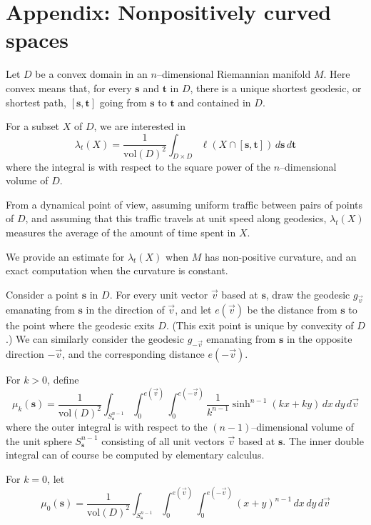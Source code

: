 \documentclass{article}
\newcommand{\s}{{\mathbf s}}
\renewcommand{\t}{{\mathbf t}}
\begin{document}
\noindent 

\noindent 
\section{Appendix: Nonpositively curved spaces}
\label{s:app}

Let $D$ be a convex domain in 
an $n$--dimensional Riemannian manifold $M$. Here convex means that, for every $\s$ and $\t$ in $D$, 
there is a unique shortest geodesic, or shortest path, $[\s,\t]$ going from $\s$ to $\t$ and contained in $D$. 

For a subset $X$ of $D$, we are interested in
$$
\lambda_t(X) =
\frac1{\mathrm{vol}(D)^2} 
\int_{D\times D} \ell(X\cap [\s,\t]) \, d\s \, d\t
$$
where the integral is with respect to the square power of the $n$--dimensional volume of $D$. 

From a dynamical point of view, assuming uniform traffic between pairs of points of $D$, 
and assuming that this traffic travels at unit speed along geodesics, 
$\lambda_t(X)$ measures the average of the amount of time spent in $X$. 

We provide an estimate for $\lambda_t(X)$ when $M$ has non-positive curvature, 
and an exact computation when the curvature is constant. 

Consider a point $\s$ in $D$.
For every unit vector $\vec{v}$ based at $\s$,  
draw the geodesic $g_{\vec{v}}$ emanating from $\s$ in the direction of $\vec{v}$, 
and let $e(\vec{v})$ be the distance from $\s$ to the point  where the geodesic exits $D$. 
(This exit point is unique by convexity of $D$.) 
We can similarly consider the geodesic $g_{-\vec{v}}$ emanating from $\s$ in the opposite direction $-\vec{v}$, 
and the corresponding distance $e(-\vec{v})$.

For $k>0$, define 
\begin{equation}
\label{e:mu_k}
\mu_k(\s) = \frac 1 {\mathrm{vol}(D)^2} 
\int_{S^{n-1}_\s} 
\int_0^{e(\vec{v})}
\int_0^{e(-\vec{v})}
{\textstyle \frac1{k^{n-1}}}
\sinh^{n-1}(kx+ky)
\,  dx\, dy \, d\vec{v}
\end{equation}
where the outer integral is with respect to the $(n-1)$--dimensional volume of the unit sphere $S^{n-1}_\s$ 
consisting of all unit vectors $\vec{v}$ based at $\s$. 
The inner double  integral can of course be computed by elementary calculus. 

For $k=0$, let
$$
\mu_0(\s) = \frac 1 {\mathrm{vol}(D)^2} 
\int_{S^{n-1}_\s} 
\int_0^{e(\vec{v})}
\int_0^{e(-\vec{v})}
(x+y)^{n-1}
\, dx\, dy \, d\vec{v}
$$
\end{document}

